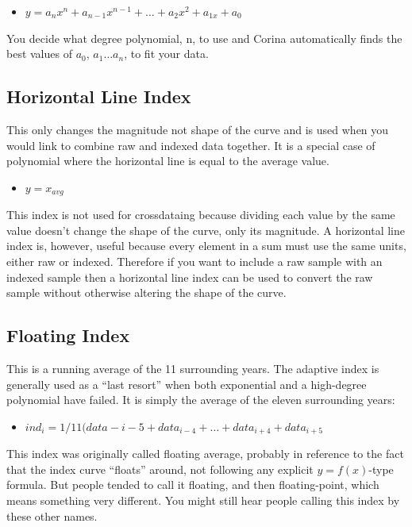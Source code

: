 \begin{itemize}
\item $y = a_{n}x^{n} + a_{n-1}x^{n-1} + \dots + a_{2}x^{2} + a_{1x} + a_{0}$ 
\end{itemize}

You decide what degree polynomial, n, to use and Corina automatically finds the best values of $a_{0}$, $a_{1} \dots a_{n}$, to fit your data. 

\subsection{Horizontal Line Index}
This only changes the magnitude not shape of the curve and is used when you would link to combine raw and indexed data together.  It is a special case of polynomial where the horizontal line is equal to the average value. 

\begin{itemize}
\item $y = x_{avg}$
\end{itemize}

This index is not used for crossdataing because dividing each value by the same value doesn't change the shape of the curve, only its magnitude. A horizontal line index is, however, useful because every element in a sum must use the same units, either raw or indexed. Therefore if you want to include a raw sample with an indexed sample then a horizontal line index can be used to convert the raw sample without otherwise altering the shape of the curve. 

\subsection{Floating Index}
This is a running average of the 11 surrounding years. The adaptive index is generally used as a ``last resort'' when both exponential and a high-degree polynomial have failed. It is simply the average of the eleven surrounding years:

\begin{itemize}
\item $ind_{i} = 1/11 (data-{i-5} + data_{i-4} + \dots + data_{i+4} + data_{i+5}$ 
\end{itemize}

This index was originally called floating average, probably in reference to the fact that the index curve ``floats'' around, not following any explicit $y=f(x)$-type formula. But people tended to call it floating, and then floating-point, which means something very different. You might still hear people calling this index by these other names.

